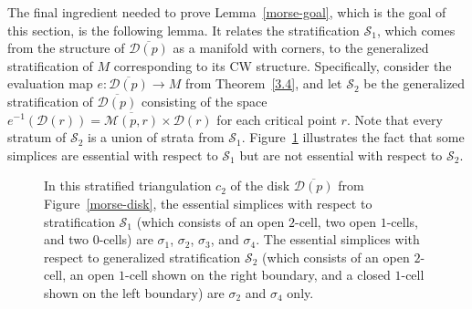 \documentclass[psamsfonts]{amsart}
\theoremstyle{remark}
\begin{document}
The final ingredient needed to prove Lemma~\ref{morse-goal}, which is the goal of this section, is the following lemma.  It relates the stratification $\mathcal{S}_1$, which comes from the structure of $\overline{\mathcal{D}(p)}$ as a manifold with corners, to the generalized stratification of $M$ corresponding to its CW structure.  Specifically, consider the evaluation map $e : \overline{\mathcal{D}(p)} \rightarrow M$ from Theorem~\ref{3.4}, and let $\mathcal{S}_2$ be the generalized stratification of $\overline{\mathcal{D}(p)}$ consisting of the space $e^{-1}(\mathcal{D}(r)) = \overline{\mathcal{M}(p, r)} \times \mathcal{D}(r)$ for each critical point $r$.  Note that every stratum of $\mathcal{S}_2$ is a union of strata from $\mathcal{S}_1$.  Figure~\ref{triangulated-disk} illustrates the fact that some simplices are essential with respect to $\mathcal{S}_1$ but are not essential with respect to $\mathcal{S}_2$.

\begin{figure}
\begin{center}
\end{center}
\caption{In this stratified triangulation $c_2$ of the disk $\overline{\mathcal{D}(p)}$ from Figure~\ref{morse-disk}, the essential simplices with respect to stratification $\mathcal{S}_1$ (which consists of an open $2$-cell, two open $1$-cells, and two $0$-cells) are $\sigma_1$, $\sigma_2$, $\sigma_3$, and $\sigma_4$.  The essential simplices with respect to generalized stratification $\mathcal{S}_2$ (which consists of an open $2$-cell, an open $1$-cell shown on the right boundary, and a closed $1$-cell shown on the left boundary) are $\sigma_2$ and $\sigma_4$ only.}\label{triangulated-disk}
\end{figure}
\end{document}
